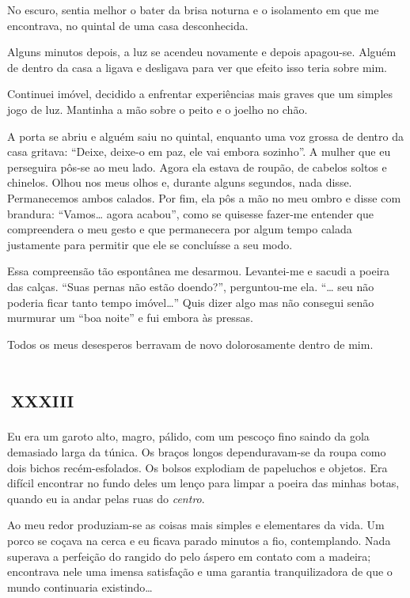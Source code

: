 No escuro, sentia melhor o bater da brisa noturna e o isolamento em que me encontrava, no quintal de uma casa desconhecida.

Alguns minutos depois, a luz se acendeu novamente e depois apagou-se. Alguém de dentro da casa a ligava e desligava para ver que efeito isso teria sobre mim.

Continuei imóvel, decidido a enfrentar experiências mais graves que um simples jogo de luz. Mantinha a mão sobre o peito e o joelho no chão.

A porta se abriu e alguém saiu no quintal, enquanto uma voz grossa de dentro da casa gritava: ``Deixe, deixe-o em paz, ele vai embora sozinho''. A mulher que eu perseguira pôs-se ao meu lado. Agora ela estava de roupão, de cabelos soltos e chinelos. Olhou nos meus olhos e, durante alguns segundos, nada disse. Permanecemos ambos calados. Por fim, ela pôs a mão no meu ombro e disse com brandura: ``Vamos\ldots{} agora acabou'', como se quisesse fazer-me entender que compreendera o meu gesto e que permanecera por algum tempo calada justamente para permitir que ele se concluísse a seu modo.

Essa compreensão tão espontânea me desarmou. Levantei-me e sacudi a poeira das calças. ``Suas pernas não estão doendo?'', perguntou-me ela. ``\ldots{} seu não poderia ficar tanto tempo imóvel\ldots{}'' Quis dizer algo mas não consegui senão murmurar um ``boa noite'' e fui embora às pressas.

Todos os meus desesperos berravam de novo dolorosamente dentro de mim.


\chapter*{\small{}\,\Large\centering\textsc{xxxiii}\,\small{}}

Eu era um garoto alto, magro, pálido, com um pescoço fino saindo da gola demasiado larga da túnica. Os braços longos dependuravam-se da roupa como dois bichos recém-esfolados. Os bolsos explodiam de papeluchos e objetos. Era difícil encontrar no fundo deles um lenço para limpar a poeira das minhas botas, quando eu ia andar pelas ruas do \textit{centro}.

Ao meu redor produziam-se as coisas mais simples e elementares da vida. Um porco se coçava na cerca e eu ficava parado minutos a fio, contemplando. Nada superava a perfeição do rangido do pelo áspero em contato com a madeira; encontrava nele uma imensa satisfação e uma garantia tranquilizadora de que o mundo continuaria existindo\ldots{}

